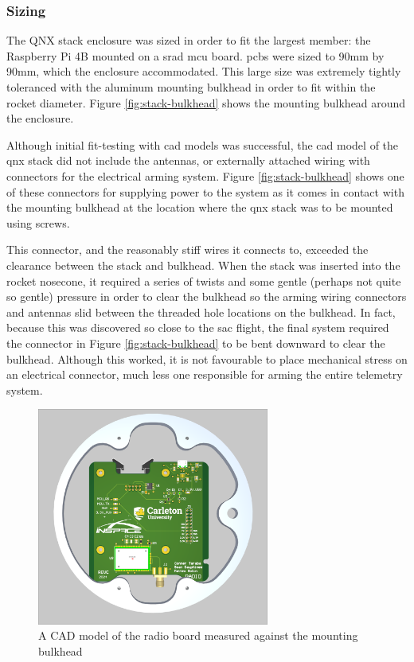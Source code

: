 \subsubsection{Sizing}

The QNX stack enclosure was sized in order to fit the largest member: the Raspberry Pi 4B mounted on a \gls{srad}
\gls{mcu} board. \Glspl{pcb} were sized to 90mm by 90mm, which the enclosure accommodated. This large size was
extremely tightly toleranced with the aluminum mounting bulkhead in order to fit within the rocket diameter. Figure
\ref{fig:stack-bulkhead} shows the mounting bulkhead around the enclosure.

Although initial fit-testing with \gls{cad} models was successful, the \gls{cad} model of the \gls{qnx} stack did not
include the antennas, or externally attached wiring with connectors for the electrical arming system. Figure
\ref{fig:stack-bulkhead} shows one of these connectors for supplying power to the system as it comes in contact with
the mounting bulkhead at the location where the \gls{qnx} stack was to be mounted using screws.

This connector, and the reasonably stiff wires it connects to, exceeded the clearance between the stack and bulkhead.
When the stack was inserted into the rocket nosecone, it required a series of twists and some gentle (perhaps not quite
so gentle) pressure in order to clear the bulkhead so the arming wiring connectors and antennas slid between the
threaded hole locations on the bulkhead. In fact, because this was discovered so close to the \gls{sac} flight, the
final system required the connector in Figure \ref{fig:stack-bulkhead} to be bent downward to clear the bulkhead.
Although this worked, it is not favourable to place mechanical stress on an electrical connector, much less one
responsible for arming the entire telemetry system.

\begin{figure}[H]
    \center
    \includegraphics[width=3in]{assets/images/rad-cad.png}
    \caption{A CAD model of the radio board measured against the mounting bulkhead}
    \label{fig:rad-cad}
\end{figure}

